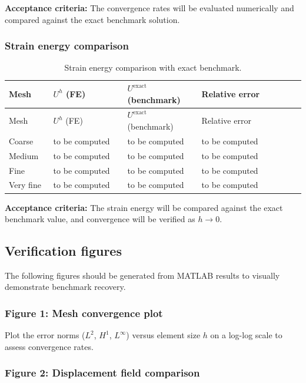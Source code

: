 \documentclass[11pt]{article}
\begin{document}
\textbf{Acceptance criteria:} The convergence rates will be evaluated numerically and compared against the exact benchmark solution.

\subsubsection{Strain energy comparison}

\begin{longtable}[c]{>{\raggedright\arraybackslash}p{0.15\linewidth}
>{\raggedright\arraybackslash}p{0.25\linewidth}
>{\raggedright\arraybackslash}p{0.25\linewidth}
>{\raggedright\arraybackslash}p{0.35\linewidth}}
\caption{Strain energy comparison with exact benchmark.}
\label{tab:energy}\\
\toprule
Mesh & $U^{h}$ (FE) & $U^{\mathrm{exact}}$ (benchmark) & Relative error \\
\midrule
\endfirsthead
\toprule
Mesh & $U^{h}$ (FE) & $U^{\mathrm{exact}}$ (benchmark) & Relative error \\
\midrule
\endhead
Coarse & to be computed & to be computed & to be computed \\
Medium & to be computed & to be computed & to be computed \\
Fine & to be computed & to be computed & to be computed \\
Very fine & to be computed & to be computed & to be computed \\
\bottomrule
\end{longtable}

\textbf{Acceptance criteria:} The strain energy will be compared against the
exact benchmark value, and convergence will be verified as $h\to 0$.
\subsection{Verification figures}
\label{ssec:figures}

The following figures should be generated from MATLAB results to
visually demonstrate benchmark recovery.

\subsubsection{Figure 1: Mesh convergence plot}

Plot the error norms ($L^{2}$, $H^{1}$, $L^{\infty}$) versus element
size $h$ on a log-log scale to assess convergence rates.

\subsubsection{Figure 2: Displacement field comparison}
\end{document}
